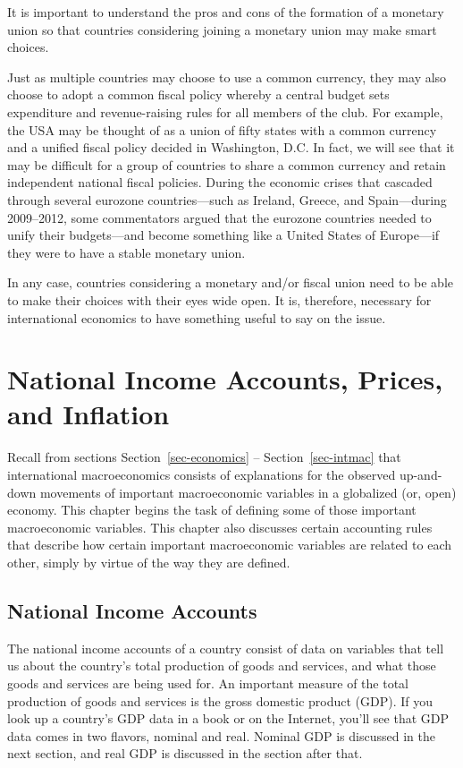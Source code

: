\documentclass[
  letterpaper,
]{book}
\begin{document}
It is important to understand the pros and cons of the formation of a
monetary union so that countries considering joining a monetary union
may make smart choices.

Just as multiple countries may choose to use a common currency, they may
also choose to adopt a common fiscal policy whereby a central budget
sets expenditure and revenue-raising rules for all members of the club.
For example, the USA may be thought of as a union of fifty states with a
common currency and a unified fiscal policy decided in Washington, D.C.
In fact, we will see that it may be difficult for a group of countries
to share a common currency and retain independent national fiscal
policies. During the economic crises that cascaded through several
eurozone countries---such as Ireland, Greece, and Spain---during
2009--2012, some commentators argued that the eurozone countries needed
to unify their budgets---and become something like a United States of
Europe---if they were to have a stable monetary union.

In any case, countries considering a monetary and/or fiscal union need
to be able to make their choices with their eyes wide open. It is,
therefore, necessary for international economics to have something
useful to say on the issue.


\chapter{National Income Accounts, Prices, and
Inflation}\label{sec-niaccounts}

Recall from sections Section~\ref{sec-economics} --
Section~\ref{sec-intmac} that international macroeconomics consists of
explanations for the observed up-and-down movements of important
macroeconomic variables in a globalized (or, open) economy. This chapter
begins the task of defining some of those important macroeconomic
variables. This chapter also discusses certain accounting rules that
describe how certain important macroeconomic variables are related to
each other, simply by virtue of the way they are defined.

\section{National Income Accounts}\label{sec-nia}

The national income accounts of a country consist of data on variables
that tell us about the country's total production of goods and services,
and what those goods and services are being used for. An important
measure of the total production of goods and services is the gross
domestic product (GDP). If you look up a country's GDP data in a book or
on the Internet, you'll see that GDP data comes in two flavors, nominal
and real. Nominal GDP is discussed in the next section, and real GDP is
discussed in the section after that.
\end{document}
